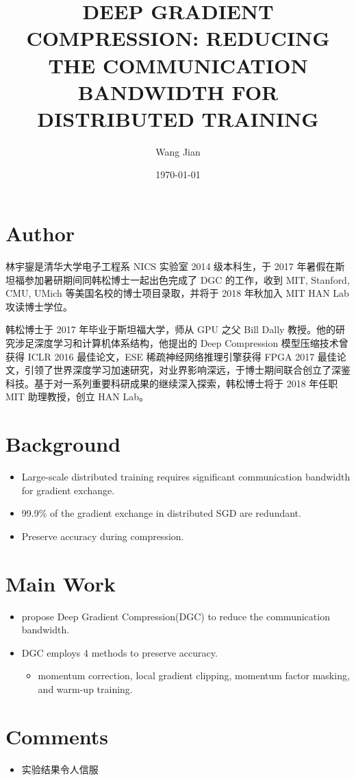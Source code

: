 \documentclass[11pt]{article}
\author{Wang Jian}
\date{\today}
\title{DEEP GRADIENT COMPRESSION: REDUCING THE COMMUNICATION BANDWIDTH FOR DISTRIBUTED TRAINING}
\begin{document}
\maketitle
\tableofcontents

\section{Author}
\label{sec:org35fd1fe}
林宇鋆是清华大学电子工程系 NICS 实验室 2014 级本科生，于 2017 年暑假在斯坦福参加暑研期间同韩松博士一起出色完成了 DGC 的工作，收到 MIT, Stanford, CMU, UMich 等美国名校的博士项目录取，并将于 2018 年秋加入 MIT HAN Lab 攻读博士学位。

韩松博士于 2017 年毕业于斯坦福大学，师从 GPU 之父 Bill Dally 教授。他的研究涉足深度学习和计算机体系结构，他提出的 Deep Compression 模型压缩技术曾获得 ICLR 2016 最佳论文，ESE 稀疏神经网络推理引擎获得 FPGA 2017 最佳论文，引领了世界深度学习加速研究，对业界影响深远，于博士期间联合创立了深鉴科技。基于对一系列重要科研成果的继续深入探索，韩松博士将于 2018 年任职 MIT 助理教授，创立 HAN Lab。
\section{Background}
\label{sec:orge98386b}
\begin{itemize}
\item Large-scale distributed training requires significant communication bandwidth for gradient exchange.
\item 99.9\% of the gradient exchange in distributed SGD are redundant.
\item Preserve accuracy during compression.
\end{itemize}
\section{Main Work}
\label{sec:orga92d1a9}
\begin{itemize}
\item propose Deep Gradient Compression(DGC) to reduce the communication bandwidth.
\item DGC employs 4 methods to preserve accuracy.
\begin{itemize}
\item momentum correction, local gradient clipping, momentum factor masking, and warm-up training.
\end{itemize}
\end{itemize}
\section{Comments}
\label{sec:org4d0e461}
\begin{itemize}
\item 实验结果令人信服
\end{itemize}
\end{document}
